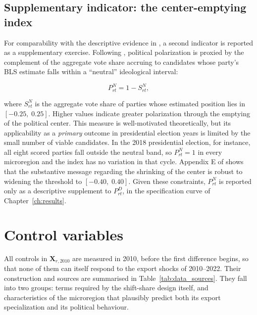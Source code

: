 \documentclass[
	11pt,				%
	oneside,			%
	a4paper,			%
	english,			%
	english				%
	]{abntex2ppgsi}
\theoremstyle{plain}
\theoremstyle{remark}
\theoremstyle{plain}%
\theoremstyle{remark}%
\begin{document}
\subsection{Supplementary indicator: the center-emptying index}
 
For comparability with the descriptive evidence in ,
a second indicator is reported as a supplementary exercise.
Following , political polarization is proxied by
the complement of the aggregate vote share accruing to candidates
whose party's BLS estimate falls within a ``neutral'' ideological
interval:
 
\begin{equation}
    P^{N}_{rt} = 1 - S^{N}_{rt},
    \label{eq:poleq}
\end{equation}
 
\noindent where $S^{N}_{rt}$ is the aggregate vote share of parties
whose estimated position lies in $[-0.25,\; 0.25]$.
Higher values indicate greater polarization through the emptying of
the political center.
This measure is well-motivated theoretically, but its applicability as
a \emph{primary} outcome in presidential election years is limited by
the small number of viable candidates.
In the 2018 presidential election, for instance, all eight scored parties fall outside the neutral band, so $P^{N}_{rt} = 1$ in every microregion and the index has no variation in that cycle. 
Appendix E of  shows that the substantive message
regarding the shrinking of the center is robust to widening the
threshold to $[-0.40,\; 0.40]$. Given these constraints, $P^{N}_{rt}$ is reported only as a descriptive supplement to $P^{D}_{rt}$, in the specification curve of Chapter~\ref{ch:results}.

\section{Control variables}
\label{subsec:controls}
 
All controls in $\mathbf{X}_{r,2010}$ are measured in 2010, before the first difference begins, so that none of them can itself respond to the export shocks of 2010--2022. Their construction and sources are summarised in Table~\ref{tab:data_sources}. They fall into two groups: terms required by the shift-share design itself, and characteristics of the microregion that plausibly predict both its export specialization and its political behaviour.
\end{document}
